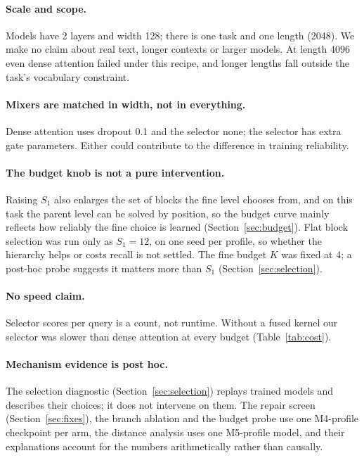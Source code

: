\paragraph{Scale and scope.} Models have 2 layers and width 128; there is one task and one length (2048). We make no
claim about real text, longer contexts or larger models. At length 4096 even dense attention failed under this
recipe, and longer lengths fall outside the task's vocabulary constraint.

\paragraph{Mixers are matched in width, not in everything.} Dense attention uses dropout 0.1 and the selector
none; the selector has extra gate parameters. Either could contribute to the difference in training reliability.

\paragraph{The budget knob is not a pure intervention.} Raising $S_1$ also enlarges the set of blocks the fine level
chooses from, and on this task the parent level can be solved by position, so the budget curve mainly reflects how
reliably the fine choice is learned (Section~\ref{sec:budget}). Flat block selection was run only as $S_1{=}12$, on one seed
per profile, so whether the hierarchy helps or costs recall is not settled. The fine budget $K$ was fixed at 4; a
post-hoc probe suggests it matters more than $S_1$ (Section~\ref{sec:selection}).

\paragraph{No speed claim.} Selector scores per query is a count, not runtime. Without a fused kernel our selector
was slower than dense attention at every budget (Table~\ref{tab:cost}).

\paragraph{Mechanism evidence is post hoc.} The selection diagnostic (Section~\ref{sec:selection}) replays trained models
and describes their choices; it does not intervene on them. The repair screen (Section~\ref{sec:fixes}), the branch
ablation and the budget probe use one M4-profile checkpoint per arm, the distance analysis uses one M5-profile model,
and their explanations account for the numbers arithmetically rather than causally.
